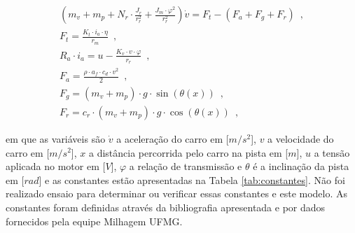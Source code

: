 \begin{subequations}
	\label{eq:modelo_1}
    \begin{align}
        \left( m_v + m_p + N_r \cdot \frac{J_r}{r_r^2}  + \frac{J_m\cdot \varphi^2}{r_r^2} \right) \dot v = F_t - (F_a + F_g + F_r) \enspace,\\   
        F_{t} =  \frac{K_t \cdot i_a \cdot \eta}{r_m} \enspace,\\
		R_{a} \cdot i_{a} = u - \frac{K_{v} \cdot v \cdot \varphi}{r_r} \enspace, \\
        F_{a} = \frac{\rho \cdot a_f \cdot c_d \cdot v^2}{2} \enspace,\\
        F_{g} = (m_v + m_p) \cdot g \cdot \sin(\theta(x)) \enspace,\\
        F_{r}  = c_{r} \cdot (m_v + m_p) \cdot g \cdot \cos(\theta(x)) \enspace,
	\end{align}
\end{subequations}

em que as variáveis são $\dot v$ a aceleração 
do carro em [$m/s^2$], $v$ a velocidade do carro em [$m/s^2$], $x$ a distância  percorrida pelo carro na pista em [$m$], 
$u$ a tensão aplicada no motor em [$V$], $\varphi$ a relação de transmissão e $\theta$ é a inclinação da pista em [$rad$] 
e as constantes estão apresentadas na Tabela \ref{tab:constantes}. Não foi realizado ensaio para determinar ou verificar essas constantes e este modelo. As constantes foram definidas através da bibliografia apresentada
e por dados fornecidos pela equipe Milhagem UFMG. 


